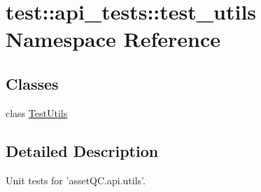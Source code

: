 \hypertarget{namespacetest_1_1api__tests_1_1test__utils}{\section{test\-:\-:api\-\_\-tests\-:\-:test\-\_\-utils \-Namespace \-Reference}
\label{da/d95/namespacetest_1_1api__tests_1_1test__utils}
}
\subsection*{\-Classes}
\begin{DoxyCompactItemize}
\item 
class \hyperlink{classtest_1_1api__tests_1_1test__utils_1_1TestUtils}{\-Test\-Utils}
\end{DoxyCompactItemize}


\subsection{\-Detailed \-Description}
\begin{DoxyVerb}
Unit tests for 'assetQC.api.utils'.
\end{DoxyVerb}
 